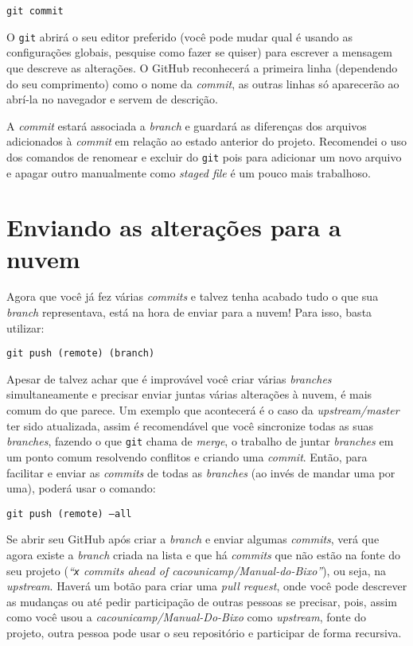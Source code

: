 \documentclass[a4paper,oneside,10pt]{memoir}
\begin{document}
\begin{center}
\texttt{git commit}
\end{center}

O \texttt{git} abrirá o seu editor preferido (você pode mudar qual é usando as
configurações globais, pesquise como fazer se quiser) para escrever a mensagem
que descreve as alterações. O GitHub reconhecerá a primeira linha (dependendo
do seu comprimento) como o nome da \emph{commit}, as outras linhas só
aparecerão ao abrí-la no navegador e servem de descrição.

A \emph{commit} estará associada a \emph{branch} e guardará as diferenças dos
arquivos adicionados à \emph{commit} em relação ao estado anterior do projeto.
Recomendei o uso dos comandos de renomear e excluir do \texttt{git} pois para
adicionar um novo arquivo e apagar outro manualmente como \emph{staged file} é
um pouco mais trabalhoso.

\section{Enviando as alterações para a nuvem}

Agora que você já fez várias \emph{commits} e talvez tenha acabado tudo o que
sua \emph{branch} representava, está na hora de enviar para a nuvem! Para isso,
basta utilizar:

\begin{center}
\texttt{git push (remote) (branch)}
\end{center}

Apesar de talvez achar que é improvável você criar várias \emph{branches}
simultaneamente e precisar enviar juntas várias alterações à nuvem, é mais
comum do que parece. Um exemplo que acontecerá é o caso da
\emph{upstream/master} ter sido atualizada, assim é recomendável que você
sincronize todas as suas \emph{branches}, fazendo o que \texttt{git} chama de
\emph{merge}, o trabalho de juntar \emph{branches} em um ponto comum resolvendo
conflitos e criando uma \emph{commit}. Então, para facilitar e enviar as
\emph{commits} de todas as \emph{branches} (ao invés de mandar uma por uma),
poderá usar o comando:

\begin{center}
\texttt{git push (remote) --all}
\end{center}

Se abrir seu GitHub após criar a \emph{branch} e enviar algumas \emph{commits},
verá que agora existe a \emph{branch} criada na lista e que há \emph{commits}
que não estão na fonte do seu projeto (\emph{``\texttt{x} commits ahead of
cacounicamp/Manual-do-Bixo''}), ou seja, na \emph{upstream}. Haverá um botão
para criar uma \emph{pull request}, onde você pode descrever as mudanças ou até
pedir participação de outras pessoas se precisar, pois, assim como você usou a
\emph{cacounicamp/Ma\-nual-Do-Bixo} como \emph{upstream}, fonte do projeto,
outra pessoa pode usar o seu repositório e participar de forma recursiva.
\end{document}
